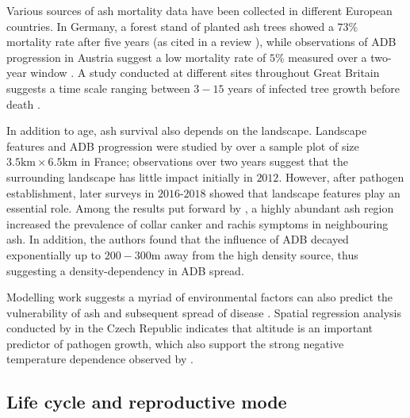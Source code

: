 Various sources of ash mortality data have been collected in different European countries.
In Germany, a forest stand of planted ash trees showed a $73\%$
mortality rate after five years \cite{langer2015ash} (as cited in a review
\cite{enderle2017ash}), while observations of ADB progression in Austria
suggest a low mortality rate of $5\%$ measured over a two-year window \cite{kessler2012dieback}. 
A study conducted at different sites throughout Great Britain suggests a time scale ranging between 
$3-15$ years of infected tree growth before death \cite{wylder2018evidence}.

In addition to age, ash survival also depends on the landscape. 
Landscape features and ADB progression were studied by \cite{https://doi.org/10.1111/1365-2745.13383} 
over a sample plot of size  $\mathrm{3.5km \times 6.5 km}$ in France; observations over two years
suggest that the surrounding landscape has little impact initially in $2012$. However, after pathogen establishment, 
later surveys in $2016$-$2018$ showed that landscape features play an essential role.
Among the results put forward by \cite{https://doi.org/10.1111/1365-2745.13383}, 
a highly abundant ash region increased the prevalence of collar canker and rachis symptoms in neighbouring ash.
In addition, the authors found that the influence of ADB decayed exponentially up to $200-300\mathrm{m}$ away from the high density source,
thus suggesting a density-dependency in ADB spread.

Modelling work suggests a myriad of environmental factors can also predict the
vulnerability of ash and subsequent spread of disease \cite{dal2014risk}.
Spatial regression analysis conducted by \cite{chumanova2019predicting} in the Czech Republic indicates that altitude 
is an important predictor of pathogen growth, which also support the strong negative temperature dependence observed by \cite{hauptman2013temperature}.

\subsection{Life cycle and reproductive mode}

